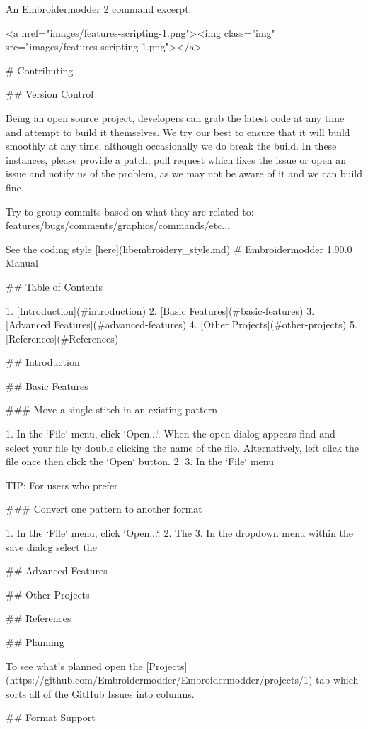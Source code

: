 \documentclass[a4paper, 11pt]{report}
\begin{document}
An Embroidermodder 2 command excerpt:

<a href="images/features-scripting-1.png"><img class="img" src="images/features-scripting-1.png"></a>

# Contributing

## Version Control 

Being an open source project, developers can grab the latest code at any time
and attempt to build it themselves. We try our best to ensure that it will build smoothly
at any time, although occasionally we do break the build. In these instances,
please provide a patch, pull request which fixes the issue or open an issue and
notify us of the problem, as we may not be aware of it and we can build fine.

Try to group commits based on what they are related to: features/bugs/comments/graphics/commands/etc...

See the coding style [here](libembroidery_style.md) # Embroidermodder 1.90.0 Manual

## Table of Contents

  1. [Introduction](#introduction)
  2. [Basic Features](#basic-features)
  3. [Advanced Features](#advanced-features)
  4. [Other Projects](#other-projects)
  5. [References](#References)

## Introduction

## Basic Features

### Move a single stitch in an existing pattern

  1. In the `File` menu, click `Open...`. When the open dialog appears find
  and select your file by double clicking the name of the file. Alternatively,
  left click the file once then click the `Open` button.
  2. 
  3. In the `File` menu

TIP: For users who prefer

### Convert one pattern to another format

  1. In the `File` menu, click `Open...`.
  2. The 
  3. In the dropdown menu within the save dialog select the 

## Advanced Features

## Other Projects


## References


## Planning

To see what's planned open the [Projects](https://github.com/Embroidermodder/Embroidermodder/projects/1) tab which sorts all of the GitHub Issues into columns.

## Format Support
\end{document}
